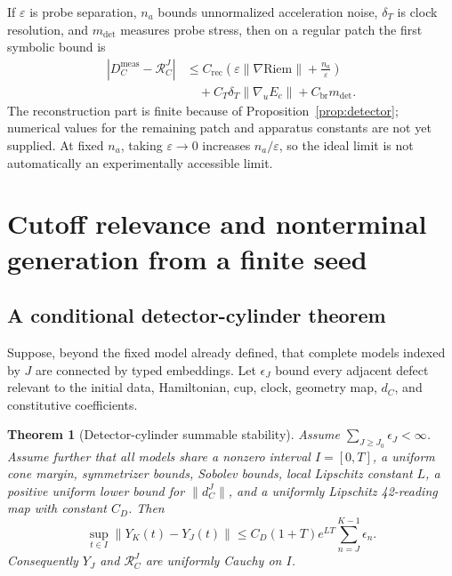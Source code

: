 \documentclass[11pt]{article}
\newtheorem{theorem}{Theorem}[section]
\theoremstyle{definition}
\theoremstyle{remark}
\newcommand{\RC}{\mathcal{R}_{C}}
\begin{document}
If $\varepsilon$ is probe separation, $n_a$ bounds unnormalized acceleration noise, $\delta_T$ is clock resolution, and $m_{\mathrm{det}}$ measures probe stress, then on a regular patch the first symbolic bound is
\begin{align}\label{eq:error}
 |D_C^{\mathrm{meas}}-\RC^{J}|
 &\le C_{\mathrm{rec}}
 \left(\varepsilon\|\nabla\mathrm{Riem}\|+\frac{n_a}{\varepsilon}\right)\\
 &\quad+C_T\delta_T\|\nabla_uE_c\|+C_{\mathrm{br}}m_{\mathrm{det}}.
\end{align}
The reconstruction part is finite because of Proposition~\ref{prop:detector}; numerical values for the remaining patch and apparatus constants are not yet supplied. At fixed $n_a$, taking $\varepsilon\to0$ increases $n_a/\varepsilon$, so the ideal limit is not automatically an experimentally accessible limit.

\section{Cutoff relevance and nonterminal generation from a finite seed}

\subsection{A conditional detector-cylinder theorem}

Suppose, beyond the fixed model already defined, that complete models indexed by $J$ are connected by typed embeddings. Let $\epsilon_J$ bound every adjacent defect relevant to the initial data, Hamiltonian, cup, clock, geometry map, $d_C$, and constitutive coefficients.

\begin{theorem}[Detector-cylinder summable stability]\label{thm:cutoff}
Assume $\sum_{J\ge J_0}\epsilon_J<\infty$. Assume further that all models share a nonzero interval $I=[0,T]$, a uniform cone margin, symmetrizer bounds, Sobolev bounds, local Lipschitz constant $L$, a positive uniform lower bound for $\|d_C^J\|$, and a uniformly Lipschitz 42-reading map with constant $C_D$. Then
\begin{equation}\label{eq:cauchy}
 \sup_{t\in I}\|Y_K(t)-Y_J(t)\|
 \le C_D(1+T)e^{LT}\sum_{n=J}^{K-1}\epsilon_n.
\end{equation}
Consequently $Y_J$ and $\RC^J$ are uniformly Cauchy on $I$.
\end{theorem}
\end{document}
